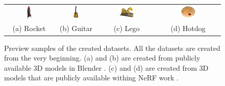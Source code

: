 \begingroup
\setlength{\tabcolsep}{15pt} %
\begin{figure}[!htb]
    \centering
    \begin{tabular}{cccc}
        \includegraphics[width=0.1\textwidth]{figures/rocket.png}
        & \includegraphics[width=0.13\textwidth]{figures/guitar.png}
        & \includegraphics[width=0.30\textwidth]{figures/lego.png}
        & \includegraphics[width=0.25\textwidth]{figures/hotdog.png} \\
        (a) Rocket & (b) Guitar & (c) Lego & (d) Hotdog
    \end{tabular}
    \caption{
    Preview samples of the created datasets.
    All the datasets are created from the very beginning.
    (a) \cite{boucher2019rocket} and (b) \cite{legalov2020guitar} are created from publicly available 3D models in Blender \cite{blender}.
    (c) and (d) are created from 3D models that are publicly available withing NeRF work \cite{mildenhall2019local}.
}
\label{fig:dataset_preview}
\end{figure}
\endgroup